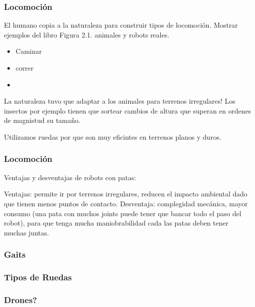 \begin{frame}
    \frametitle{Locomoción}
    El humano copia a la naturaleza para construir tipos de locomoción.
    Mostrar ejemplos del libro Figura 2.1. animales y robots reales.
    
    \begin{itemize}
        \item Caminar
        \item correr
        \item
    \end{itemize}
    
    La naturaleza tuvo que adaptar a los animales para terrenos irregulares!
    Los insectos por ejemplo tienen que sortear cambios de altura que superan en ordenes de magnistud su tamaño.
    
    Utilizamos ruedas por que son muy eficintes en terrenos planos y duros.
    
\end{frame}


\begin{frame}
    \frametitle{Locomoción}
    Ventajas y desventajas de robots con patas:
    
    Ventajas: permite ir por terrenos irregulares, reducen el impacto ambiental dado que tienen menos puntos de contacto.
    Desventaja: complegidad mecánica, mayor consumo (una pata con muchos joints puede tener que bancar todo el paso del robot), para que tenga mucha maniobrabilidad cada las patas deben tener muchas juntas.
    
\end{frame}


\begin{frame}
    \frametitle{Gaits}
    
\end{frame}


\begin{frame}
    \frametitle{Tipos de Ruedas}

\end{frame}

\begin{frame}
    \frametitle{Drones?}
    
\end{frame}